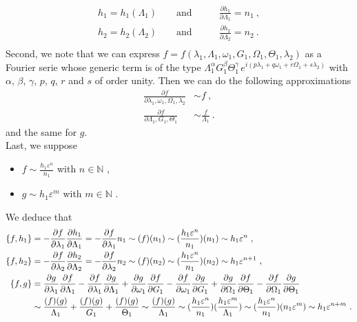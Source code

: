 \documentclass[a4paper]{article}
\begin{document}
\begin{align}
h_{1}=h_{1}(\Lambda_{1}) \qquad \text{and}& \qquad \frac{\partial h_{1}}{\partial \Lambda_{1}}=n_{1} \ , \\
h_{2}=h_{2}(\Lambda_{2}) \qquad \text{and}& \qquad \frac{\partial h_{2}}{\partial \Lambda_{2}}=n_{2} \ . \\
\end{align}
Second, we note that we can express $f=f(\lambda_{1},\Lambda_{1},\omega_{1},G_{1},\Omega_{1},\Theta_{1},\lambda_{2})$ as a Fourier serie whose generic term is of the type $\Lambda_{1}^{\alpha}G_{1}^{\beta}\Theta_{1}^{\gamma} \, e^{i(p\lambda_{1}+q\omega_{1}+r\Omega_{1}+s\lambda_{2})}$ with $\alpha$, $\beta$, $\gamma$, $p$, $q$, $r$ and $s$ of order unity. Then we can do the following approximations
\begin{align}
\label{approx1}
\frac{\partial f}{\partial \lambda_{1}, \omega_{1}, \Omega_{1}, \lambda_{2}} &\sim f  \ , \\
\label{approx2}
\frac{\partial f}{\partial \Lambda_{1},G_{1},\Theta_{1}} &\sim \frac{f}{\Lambda_{1}}  \ .
\end{align}
and the same for $g$. \\
Last, we suppose  
\begin{itemize}
\item
$f \sim \frac{h_{1}\varepsilon^{n}}{n_{1}}$ with $n \in \mathbb N$ ,
\item
$g \sim h_{1}\varepsilon^{m}$ with $m \in \mathbb N$ .
\end{itemize}
We deduce that
\begin{align}
\label{fh1}
\{f,h_{1}\}&=-\frac{\partial f}{\partial \lambda_{1}}\frac{\partial h_{1}}{\partial \Lambda_{1}}=-\frac{\partial f}{\partial \lambda_{1}}n_{1} \sim (f)(n_{1}) \sim (\frac{h_{1}\varepsilon^{n}}{n_{1}})(n_{1}) \sim h_{1}\varepsilon^{n} \ , \\
\label{fh2}
\{f,h_{2}\}&=-\frac{\partial f}{\partial \lambda_{2}}\frac{\partial h_{2}}{\partial \Lambda_{2}}=-\frac{\partial f}{\partial \lambda_{2}}n_{2} \sim (f)(n_{2}) \sim (\frac{h_{1}\varepsilon^{n}}{n_{1}})(n_{2}) \sim h_{1}\varepsilon^{n+1} \ , \\
\label{fg}
\{f,g\}&=\frac{\partial g}{\partial \lambda_{1}}\frac{\partial f}{\partial \Lambda_{1}}-\frac{\partial f}{\partial \lambda_{1}}\frac{\partial g}{\partial \Lambda_{1}}
+\frac{\partial g}{\partial \omega_{1}}\frac{\partial f}{\partial G_{1}}-\frac{\partial f}{\partial \omega_{1}}\frac{\partial g}{\partial G_{1}} 
+\frac{\partial g}{\partial \Omega_{1}}\frac{\partial f}{\partial \Theta_{1}}-\frac{\partial f}{\partial \Omega_{1}}\frac{\partial g}{\partial \Theta_{1}} \notag \\
&\sim \frac{(f)(g)}{\Lambda_{1}}+\frac{(f)(g)}{G_{1}}+\frac{(f)(g)}{\Theta_{1}}
\sim \frac{(f)(g)}{\Lambda_{1}}
\sim (\frac{h_{1}\varepsilon^{n}}{n_{1}})(\frac{h_{1}\varepsilon^{m}}{\Lambda_{1}})
\sim (\frac{h_{1}\varepsilon^{n}}{n_{1}})(n_{1}\varepsilon^m)
\sim h_{1}\varepsilon^{n+m} \ .
\end{align}
\end{document}
